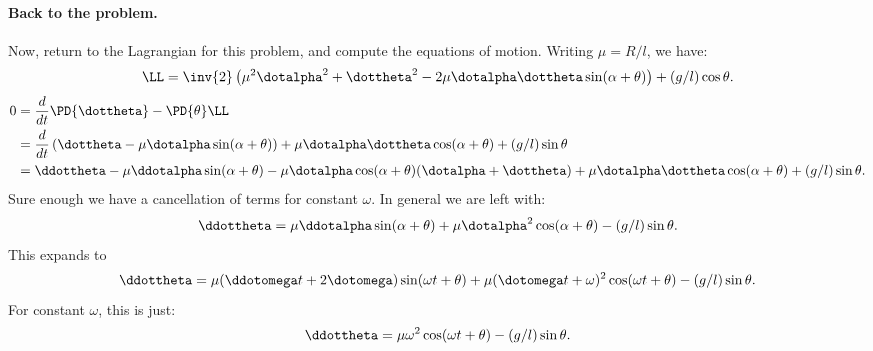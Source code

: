 {\paragraph{Back to the problem.}
%
Now, return to the Lagrangian for this problem, and compute the equations of motion.  Writing \(\mu = R/l\), we have:
%
\begin{equation}\label{eqn:tongMf1:1640}
\LL = \inv{2} \left( \mu^2 \dotalpha^2 + \dottheta^2 - 2 \mu \dotalpha \dottheta \sin( \alpha +\theta ) \right) + (g/l) \cos\theta.
\end{equation}
%
\begin{equation}\label{eqn:tongMf1:580}
\begin{aligned}
0 &= \frac{d}{dt}\PD{\dottheta} -\PD{\theta} \LL \\
&= \frac{d}{dt} \left(\dottheta - \mu \dotalpha \sin(\alpha + \theta)\right) + \mu \dotalpha \dottheta \cos(\alpha + \theta) + (g/l) \sin\theta \\
&= \ddottheta - \mu \ddotalpha \sin(\alpha + \theta) - \mu \dotalpha \cos(\alpha + \theta) (\dotalpha + \dottheta) + \mu \dotalpha \dottheta \cos(\alpha + \theta) + (g/l) \sin\theta .
\end{aligned}
\end{equation}
%
Sure enough we have a cancellation of terms for constant \(\omega\).  In general we are left with:
%
\begin{equation}\label{eqn:tongMf1:1660}
\ddottheta = \mu \ddotalpha \sin(\alpha + \theta) + \mu \dotalpha^2 \cos(\alpha + \theta) - (g/l) \sin\theta.
\end{equation}
%
This expands to
\begin{equation}\label{eqn:tongMf1:1680}
\ddottheta = \mu (\ddotomega t + 2\dotomega) \sin(\omega t + \theta) + \mu (\dotomega t + \omega)^2 \cos(\omega t + \theta) - (g/l) \sin\theta.
\end{equation}
%
For constant \(\omega\), this is just:
\begin{equation}\label{eqn:tongMf1:1700}
\ddottheta = \mu \omega^2 \cos(\omega t + \theta) - (g/l) \sin\theta.
\end{equation}
}
%

